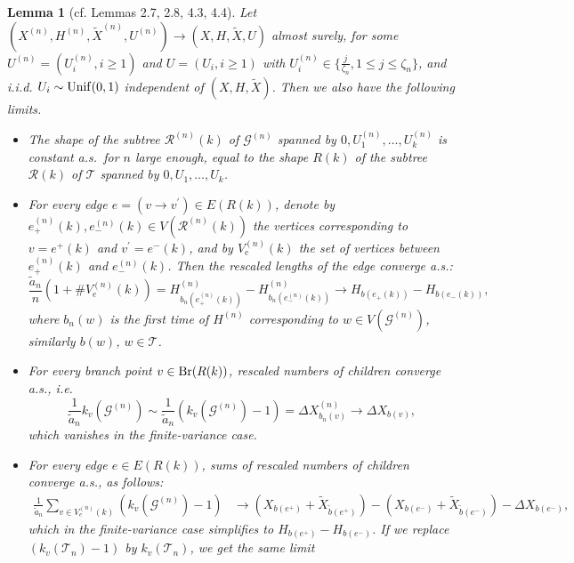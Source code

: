 \documentclass[11pt,a4paper]{article}
\newtheorem{lm}[prop]{Lemma}
\newcommand{\cG}{\mathcal{G}}
\newcommand{\cR}{\mathcal{R}}
\newcommand{\cT}{\mathcal{T}}
\begin{document}
\begin{lm}[cf. \cite{Die13} Lemmas 2.7, 2.8, 4.3, 4.4]\label{lmlimits} Let $(X^{(n)},H^{(n)},\widetilde{X}^{(n)},U^{(n)})\rightarrow(X,H,\widetilde{X},U)$ almost surely, for some
  $U^{(n)}=(U^{(n)}_i,i\ge 1)$ and $U=(U_i,i\ge 1)$ with $U^{(n)}_i\in\{\frac{j}{\zeta_n},1\le j\le\zeta_n\}$, and i.i.d. $U_i\sim{\rm Unif}(0,1)$ independent of 
  $(X,H,\widetilde{X})$. Then we also have the following limits.
  \begin{itemize}
    \item The shape of the subtree $\cR^{(n)}(k)$ of $\cG^{(n)}$ spanned by $0,U_1^{(n)},\ldots,U_k^{(n)}$ is constant a.s.\
      for $n$ large enough, equal to the shape $R(k)$ of the subtree $\cR(k)$ of $\cT$ spanned by $0,U_1,\ldots,U_k$.
    \item For every edge $e=(v\rightarrow v^\prime)\in E(R(k))$, denote by $e^{(n)}_+(k),e^{(n)}_-(k)\in V(\cR^{(n)}(k))$ the vertices corresponding to $v=e^+(k)$ and $v^\prime=e^-(k)$,
      and by
      $V_e^{(n)}(k)$ the set of vertices between $e^{(n)}_+(k)$ and $e^{(n)}_-(k)$. Then the rescaled lengths of the edge converge a.s.:
      $$\frac{\widetilde{a}_n}{n}\left(1+\#V_e^{(n)}(k)\right)=H_{b_n(e^{(n)}_+(k))}^{(n)}-H_{b_n(e^{(n)}_-(k))}^{(n)}\rightarrow H_{b(e_+(k))}-H_{b(e_-(k))},$$
      where $b_n(w)$ is the first time of $H^{(n)}$ corresponding to $w\in V(\cG^{(n)})$, similarly $b(w)$, $w\in\cT$.
    \item For every branch point $v\in{\rm Br}(R(k))$, rescaled numbers of children converge a.s., i.e.
      $$\frac{1}{\widetilde{a}_n}k_v(\cG^{(n)})\sim\frac{1}{\widetilde{a}_n}\left(k_v(\cG^{(n)})-1\right)=\Delta X_{b_n(v)}^{(n)}\rightarrow\Delta X_{b(v)},$$
      which vanishes in the finite-variance case.
    \item For every edge $e\in E(R(k))$, sums of rescaled numbers of children converge a.s., as follows:
      \begin{align*}\frac{1}{\widetilde{a}_n}\sum_{v\in V_e^{(n)}(k)}\left(k_v(\cG^{(n)})-1\right)
		&\rightarrow (X_{b(e^+)}+\widetilde{X}_{\widetilde{b}(e^+)})-(X_{b(e^-)}+\widetilde{X}_{\widetilde{b}(e^-)})-\Delta X_{b(e^-)},
      \end{align*}
      which in the finite-variance case simplifies to $H_{b(e^+)}-H_{b(e^-)}$. If we replace $(k_v(\cT_n)-1)$ by $k_v(\cT_n)$, we get the same limit

\end{itemize}
\end{lm}
\end{document}
